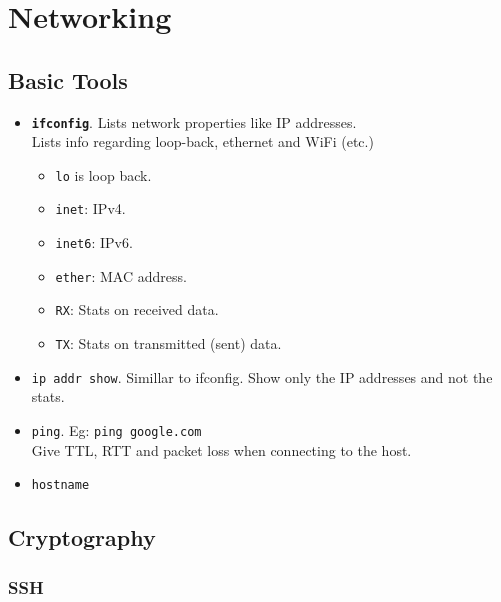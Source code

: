 \section{Networking}

\subsection{Basic Tools}

\begin{itemize}
\item \textbf{\texttt{ifconfig}}. Lists network properties like IP addresses.\\
        Lists info regarding loop-back, ethernet and WiFi (etc.)\\
        \begin{itemize}
        \item \texttt{lo} is loop back.\\
        \item \texttt{inet}: IPv4.\\
        \item \texttt{inet6}: IPv6.\\
        \item \texttt{ether}: MAC address.\\
        \item \texttt{RX}: Stats on received data.\\
        \item \texttt{TX}: Stats on transmitted (sent) data.\\
        \end{itemize}
\item \texttt{ip addr show}. Simillar to ifconfig. Show only the IP addresses and not the stats.
\item \texttt{ping}. Eg: \texttt{ping google.com}\\
        Give TTL, RTT and packet loss when connecting to the host.\\
\item \texttt{hostname}
\end{itemize}


\subsection{Cryptography}

\subsubsection{SSH}

